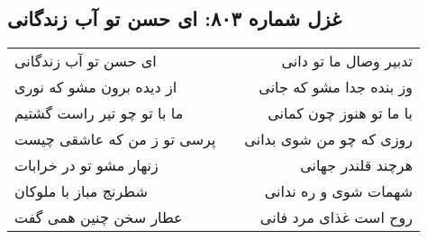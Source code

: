 \begin{center}
\section*{غزل شماره ۸۰۳: ای حسن تو آب زندگانی}
\label{sec:803}
\begin{longtable}{l p{0.5cm} r}
ای حسن تو آب زندگانی
&&
تدبیر وصال ما تو دانی
\\
از دیده برون مشو که نوری
&&
وز بنده جدا مشو که جانی
\\
ما با تو چو تیر راست گشتیم
&&
با ما تو هنوز چون کمانی
\\
پرسی تو ز من که عاشقی چیست
&&
روزی که چو من شوی بدانی
\\
زنهار مشو تو در خرابات
&&
هرچند قلندر جهانی
\\
شطرنج مباز با ملوکان
&&
شهمات شوی و ره ندانی
\\
عطار سخن چنین همی گفت
&&
روح است غذای مرد فانی
\\
\end{longtable}
\end{center}
